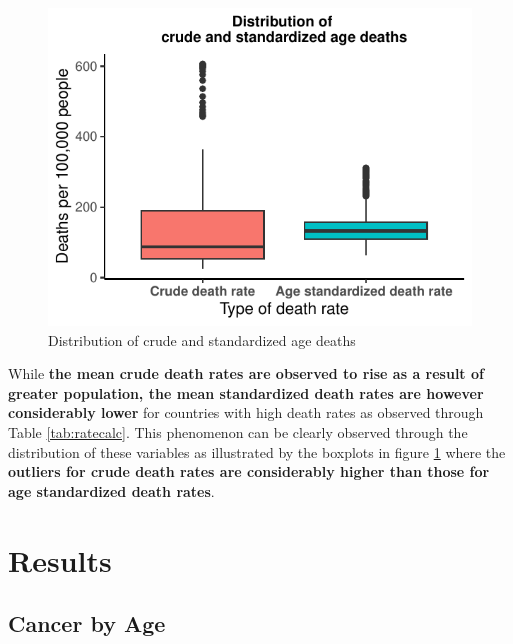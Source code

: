 \documentclass[11pt,a4paper,]{article}
\begin{document}
\begin{figure}

{\centering \includegraphics{etc5513_assignment2_g1_t1_files/figure-latex/boxplot-1} 

}

\caption{Distribution of crude and standardized age deaths}\label{fig:boxplot}
\end{figure}

While \textbf{the mean crude death rates are observed to rise as a result of greater population, the mean standardized death rates are however considerably lower} for countries with high death rates as observed through Table \ref{tab:ratecalc}. This phenomenon can be clearly observed through the distribution of these variables as illustrated by the boxplots in figure \ref{fig:boxplot} where the \textbf{outliers for crude death rates are considerably higher than those for age standardized death rates}.

\hypertarget{results}{%
\section{\texorpdfstring{Results \label{section:results}}{Results }}\label{results}}

\hypertarget{cancer-by-age-1}{%
\subsection{Cancer by Age}\label{cancer-by-age-1}}
\end{document}
